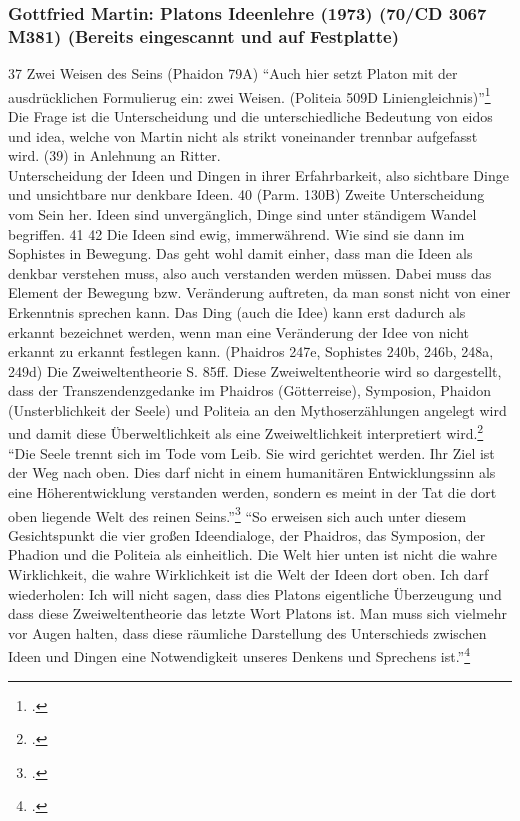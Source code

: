 \documentclass[12pt]{article}
\begin{document}
\subsubsection*{Gottfried Martin: Platons Ideenlehre (1973) (70/CD 3067 M381) (Bereits eingescannt und auf Festplatte)}
37 Zwei Weisen des Seins (Phaidon 79A)
\enquote{Auch hier setzt Platon mit der ausdrücklichen Formulierug ein: zwei Weisen. (Politeia 509D Liniengleichnis)}\footcite[][S. 39]{Martin73}
Die Frage ist die Unterscheidung und die unterschiedliche Bedeutung von eidos und idea, welche von Martin nicht als strikt voneinander trennbar aufgefasst wird. (39) in Anlehnung an Ritter.\\
Unterscheidung der Ideen und Dingen in ihrer Erfahrbarkeit, also sichtbare Dinge und unsichtbare nur denkbare Ideen. 40 (Parm. 130B) Zweite Unterscheidung vom Sein her. Ideen sind unvergänglich, Dinge sind unter ständigem Wandel begriffen. 41
42 Die Ideen sind ewig, immerwährend. Wie sind sie dann im Sophistes in Bewegung. Das geht wohl damit einher, dass man die Ideen als denkbar verstehen muss, also auch verstanden werden müssen. Dabei muss das Element der Bewegung bzw. Veränderung auftreten, da man sonst nicht von einer Erkenntnis sprechen kann. Das Ding (auch die Idee) kann erst dadurch als erkannt bezeichnet werden, wenn man eine Veränderung der Idee von nicht erkannt zu erkannt festlegen kann. (Phaidros 247e, Sophistes 240b, 246b, 248a, 249d)
Die Zweiweltentheorie S. 85ff.
Diese Zweiweltentheorie wird so dargestellt, dass der Transzendenzgedanke im Phaidros (Götterreise), Symposion, Phaidon (Unsterblichkeit der Seele) und Politeia an den Mythoserzählungen angelegt wird und damit diese Überweltlichkeit als eine Zweiweltlichkeit interpretiert wird.\footcite[vgl.][S. 88ff.]{Martin73}
\enquote{Die Seele trennt sich im Tode vom Leib. Sie wird gerichtet werden. Ihr Ziel ist der Weg nach oben. Dies darf nicht in einem humanitären Entwicklungssinn als eine Höherentwicklung verstanden werden, sondern es meint in der Tat die dort oben liegende Welt des reinen Seins.}\footcite[][S. 93]{Martin73}
\enquote{So erweisen sich auch unter diesem Gesichtspunkt die vier großen Ideendialoge, der Phaidros, das Symposion, der Phadion und die Politeia als einheitlich. Die Welt hier unten ist nicht die wahre Wirklichkeit, die wahre Wirklichkeit ist die Welt der Ideen dort oben. Ich darf wiederholen: Ich will nicht sagen, dass dies Platons eigentliche Überzeugung und dass diese Zweiweltentheorie das letzte Wort Platons ist. Man muss sich vielmehr vor Augen halten, dass diese räumliche Darstellung des Unterschieds zwischen Ideen und Dingen eine Notwendigkeit unseres Denkens und Sprechens ist.}\footcite[][S. 96]{Martin73}
\end{document}

